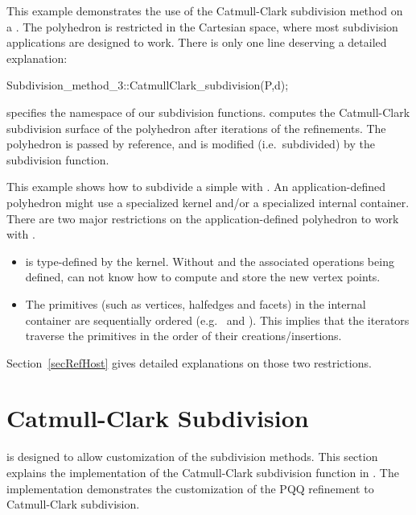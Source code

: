 
This example demonstrates the use of the Catmull-Clark subdivision method
on a . The polyhedron is restricted in the Cartesian
space, where most subdivision applications are designed to work.
There is only one line deserving a detailed explanation:
\begin{ccExampleCode}
Subdivision_method_3::CatmullClark_subdivision(P,d);
\end{ccExampleCode}
 specifies the namespace of our
subdivision functions.  computes the 
Catmull-Clark subdivision surface of the polyhedron  after
 iterations of the refinements. The polyhedron  is 
passed by reference, and is modified (i.e.~subdivided) by the 
subdivision function.


This example shows how to subdivide a simple 
with .
An application-defined polyhedron might use a specialized kernel and/or
a specialized internal container. There are two major restrictions on the 
application-defined polyhedron to work with 
.
\begin{itemize}
\item
{} is type-defined by the kernel. Without  
and the associated operations being defined,  
can not know how to compute and store the new vertex points.
\item
The primitives (such as vertices, halfedges and facets) 
in the internal container are sequentially ordered (e.g.~
 and ).
This implies that the iterators traverse the primitives in 
the order of their creations/insertions.
\end{itemize}

Section~\ref{secRefHost} gives detailed explanations on those 
two restrictions.

\section{Catmull-Clark Subdivision}
\label{secCC}
 is designed to allow customization of 
the subdivision methods. This section explains the implementation
of the Catmull-Clark subdivision function in .
The implementation demonstrates the customization of the PQQ refinement 
to Catmull-Clark subdivision. 

